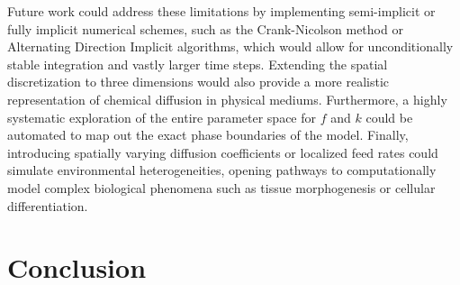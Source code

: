\documentclass[10pt, journal]{IEEEtran}
\begin{document}
Future work could address these limitations by implementing semi-implicit or fully implicit numerical schemes, such as the Crank-Nicolson method or Alternating Direction Implicit algorithms, which would allow for unconditionally stable integration and vastly larger time steps. Extending the spatial discretization to three dimensions would also provide a more realistic representation of chemical diffusion in physical mediums. Furthermore, a highly systematic exploration of the entire parameter space for $f$ and $k$ could be automated to map out the exact phase boundaries of the model. Finally, introducing spatially varying diffusion coefficients or localized feed rates could simulate environmental heterogeneities, opening pathways to computationally model complex biological phenomena such as tissue morphogenesis or cellular differentiation.



\section{Conclusion}
\end{document}
